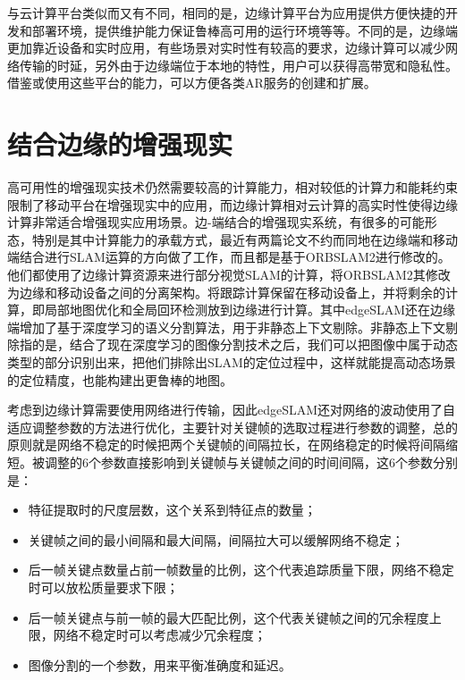 与云计算平台类似而又有不同，相同的是，边缘计算平台为应用提供方便快捷的开发和部署环境，提供维护能力保证鲁棒高可用的运行环境等等。不同的是，边缘端更加靠近设备和实时应用，有些场景对实时性有较高的要求，边缘计算可以减少网络传输的时延，另外由于边缘端位于本地的特性，用户可以获得高带宽和隐私性。借鉴或使用这些平台的能力，可以方便各类AR服务的创建和扩展。

\section{结合边缘的增强现实}
高可用性的增强现实技术仍然需要较高的计算能力，相对较低的计算力和能耗约束限制了移动平台在增强现实中的应用，而边缘计算相对云计算的高实时性使得边缘计算非常适合增强现实应用场景。边-端结合的增强现实系统，有很多的可能形态，特别是其中计算能力的承载方式，最近有两篇论文不约而同地在边缘端和移动端结合进行SLAM运算的方向做了工作，而且都是基于ORBSLAM2进行修改的。他们都使用了边缘计算资源来进行部分视觉SLAM的计算，将ORBSLAM2其修改为边缘和移动设备之间的分离架构。将跟踪计算保留在移动设备上，并将剩余的计算，即局部地图优化和全局回环检测放到边缘进行计算。其中edgeSLAM\cite{ben2020edge}还在边缘端增加了基于深度学习的语义分割算法，用于非静态上下文剔除。非静态上下文剔除指的是，结合了现在深度学习的图像分割技术之后，我们可以把图像中属于动态类型的部分识别出来，把他们排除出SLAM的定位过程中，这样就能提高动态场景的定位精度，也能构建出更鲁棒的地图。

考虑到边缘计算需要使用网络进行传输，因此edgeSLAM还对网络的波动使用了自适应调整参数的方法进行优化，主要针对关键帧的选取过程进行参数的调整，总的原则就是网络不稳定的时候把两个关键帧的间隔拉长，在网络稳定的时候将间隔缩短。被调整的6个参数直接影响到关键帧与关键帧之间的时间间隔，这6个参数分别是：
\begin{itemize}
  \item 特征提取时的尺度层数，这个关系到特征点的数量；
  \item 关键帧之间的最小间隔和最大间隔，间隔拉大可以缓解网络不稳定；
  \item 后一帧关键点数量占前一帧数量的比例，这个代表追踪质量下限，网络不稳定时可以放松质量要求下限；
  \item 后一帧关键点与前一帧的最大匹配比例，这个代表关键帧之间的冗余程度上限，网络不稳定时可以考虑减少冗余程度；
  \item 图像分割的一个参数，用来平衡准确度和延迟。
\end{itemize}

